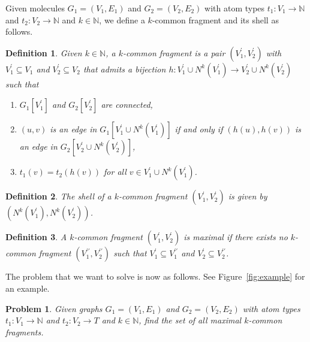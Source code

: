 \documentclass[11pt]{article}
\newtheorem{problem}{Problem}[section]
\newtheorem{definition}{Definition}[section]
\begin{document}
Given molecules $G_1 = (V_1, E_1)$ and $G_2 = (V_2, E_2)$ with atom types $t_1 :
V_1 \rightarrow \mathbb{N}$ and $t_2 : V_2 \rightarrow \mathbb{N}$ and $k \in
\mathbb{N}$, we define a $k$-common fragment and its shell as follows.

\begin{definition}
Given $k \in \mathbb{N}$, a \emph{$k$-common fragment} is a pair $(V^\prime_1,
V^\prime_2)$ with $V^\prime_1 \subseteq V_1$ and $V^\prime_2 \subseteq V_2$ that
admits a bijection $h : V^\prime_1 \cup N^k(V^\prime_1) \rightarrow V^\prime_2
\cup N^k(V^\prime_2)$ such that
\begin{enumerate}
  \item[(i)] $G_1[V^\prime_1]$ and $G_2[V^\prime_2]$ are connected,
  \item[(ii)] $(u,v)$ is an edge in $G_1[V^\prime_1 \cup N^k(V^\prime_1)]$ if and
    only if $(h(u),h(v))$ is an edge in ${G_2[V^\prime_2 \cup
    N^k(V^\prime_2)]}$,
  \item[(iii)] $t_1(v) = t_2(h(v))$ for all $v \in V^\prime_1 \cup
    N^k(V^\prime_1)$.
\end{enumerate}
\end{definition}

\begin{definition}
The \emph{shell} of a $k$-common fragment $(V^\prime_1, V^\prime_2)$ is given by
$(N^k(V^\prime_1), N^k(V^\prime_2))$.
\end{definition}

\begin{definition}
A $k$-common fragment $(V^\prime_1,V^\prime_2)$ is \emph{maximal} if there
exists no $k$-common fragment $(V^{\prime\prime}_1,V^{\prime\prime}_2)$ such
that $V^\prime_1 \subseteq V^{\prime\prime}_1$ and $V^\prime_2 \subseteq
V^{\prime\prime}_2$.
\end{definition}

The problem that we want to solve is now as follows. See
Figure~\ref{fig:example} for an example.

\begin{problem}
Given graphs $G_1 = (V_1, E_1)$ and $G_2 = (V_2, E_2)$ with atom types $t_1 :
V_1 \rightarrow \mathbb{N}$ and $t_2 : V_2 \rightarrow T$ and $k \in
\mathbb{N}$, find the set of all maximal $k$-common fragments.
\end{problem}
\end{document}
